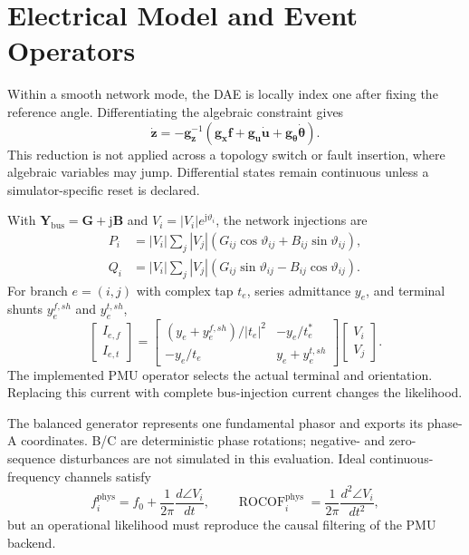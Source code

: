 \documentclass{ieeeaccess}
\begin{document}
\section{Electrical Model and Event Operators}

Within a smooth network mode, the DAE is locally index one after fixing the reference angle. Differentiating the algebraic constraint gives
\begin{equation}
 \dot{\bm z}=-\bm g_{\bm z}^{-1}
 (\bm g_{\bm x}\bm f+\bm g_{\bm u}\dot{\bm u}
 +\bm g_{\bm\theta}\dot{\bm\theta}).
 \label{eq:supp-index-one}
\end{equation}
This reduction is not applied across a topology switch or fault insertion, where algebraic variables may jump. Differential states remain continuous unless a simulator-specific reset is declared.

With $\bm Y_{\mathrm{bus}}=\bm G+\mathrm j\bm B$ and $V_i=|V_i|e^{\mathrm j\vartheta_i}$, the network injections are
\begin{align}
 P_i&=|V_i|\sum_j|V_j|(G_{ij}\cos\vartheta_{ij}+B_{ij}\sin\vartheta_{ij}),\\
 Q_i&=|V_i|\sum_j|V_j|(G_{ij}\sin\vartheta_{ij}-B_{ij}\cos\vartheta_{ij}).
 \label{eq:supp-ac}
\end{align}
For branch $e=(i,j)$ with complex tap $t_e$, series admittance $y_e$, and terminal shunts $y_e^{f,sh}$ and $y_e^{t,sh}$,
\begin{equation}
 \begin{bmatrix}I_{e,f}\\I_{e,t}\end{bmatrix}=
 \begin{bmatrix}
 (y_e+y_e^{f,sh})/|t_e|^2&-y_e/t_e^*\\
 -y_e/t_e&y_e+y_e^{t,sh}
 \end{bmatrix}
 \begin{bmatrix}V_i\\V_j\end{bmatrix}.
 \label{eq:supp-terminal-current}
\end{equation}
The implemented PMU operator selects the actual terminal and orientation. Replacing this current with complete bus-injection current changes the likelihood.

The balanced generator represents one fundamental phasor and exports its phase-A coordinates. B/C are deterministic phase rotations; negative- and zero-sequence disturbances are not simulated in this evaluation. Ideal continuous-frequency channels satisfy
\begin{equation}
 f_i^{\mathrm{phys}}=f_0+\frac{1}{2\pi}\frac{d\angle V_i}{dt},\qquad
 \operatorname{ROCOF}_i^{\mathrm{phys}}=\frac{1}{2\pi}\frac{d^2\angle V_i}{dt^2},
\end{equation}
but an operational likelihood must reproduce the causal filtering of the PMU backend.
\end{document}
